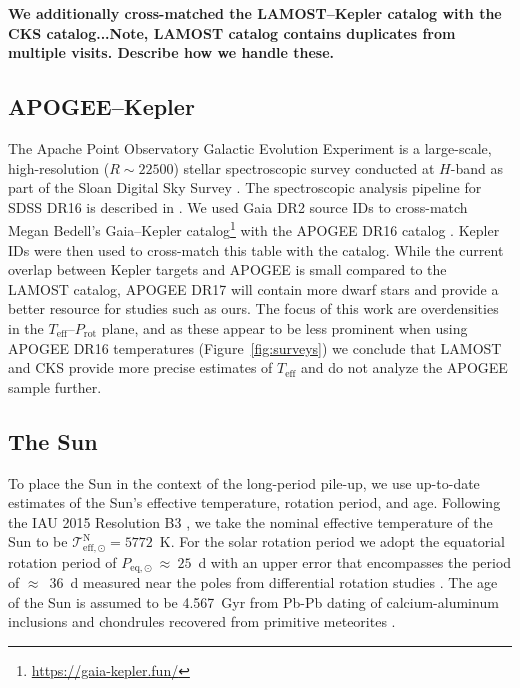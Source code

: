 \documentclass[linenumbers,tighten,trackchanges,twocolumn]{aastex631}
\newcommand{\teff}{\ensuremath{T_{\mathrm{eff}}}\xspace}
\newcommand{\prot}{\ensuremath{P_\mathrm{rot}}\xspace}
\begin{document}
\textbf{We additionally cross-matched the LAMOST--Kepler catalog with the CKS catalog...Note, LAMOST catalog contains duplicates from multiple visits. Describe how we handle these.}

\subsection{APOGEE--Kepler}
The Apache Point Observatory Galactic Evolution Experiment \citep[APOGEE,][]{Majewski2017} is a large-scale, high-resolution ($R \sim 22500$) stellar spectroscopic survey conducted at $H$-band as part of the Sloan Digital Sky Survey \citep[SDSS-IV][]{Blanton2017}. The spectroscopic analysis pipeline for SDSS DR16 is described in \citet{Jonsson2020}. We used Gaia DR2 source IDs \citep{Gaia2016, Gaia2018} to cross-match Megan Bedell's Gaia--Kepler catalog\footnote{\url{https://gaia-kepler.fun/}} with the APOGEE DR16 catalog \citep{Ahumada2020}. Kepler IDs were then used to cross-match this table with the \citet{McQuillan2014} catalog. While the current overlap between Kepler targets and APOGEE is small compared to the LAMOST catalog, APOGEE DR17 will contain more dwarf stars and provide a better resource for studies such as ours. The focus of this work are overdensities in the \teff--\prot plane, and as these appear to be less prominent when using  APOGEE DR16 temperatures (Figure~\ref{fig:surveys}) we conclude that LAMOST and CKS provide more precise estimates of \teff and do not analyze the APOGEE sample further. 

\subsection{The Sun}
To place the Sun in the context of the long-period pile-up, we use up-to-date estimates of the Sun's effective temperature, rotation period, and age. Following the IAU 2015 Resolution B3 \citep{Mamajek2015}, we take the nominal effective temperature of the Sun to be $\mathcal{T}^\mathrm{N}_\mathrm{eff,\odot} = 5772$~K. For the solar rotation period we adopt the equatorial rotation period of $P_\mathrm{eq,\odot}~\approx~25$~d with an upper error that encompasses the period of $\approx$~36~d measured near the poles from differential rotation studies \citep[][and references therein]{Thompson2003}.  The age of the Sun is assumed to be 4.567~Gyr from Pb-Pb dating of calcium-aluminum inclusions and chondrules recovered from primitive meteorites \citep{Bahcall1995}.

\end{document}
